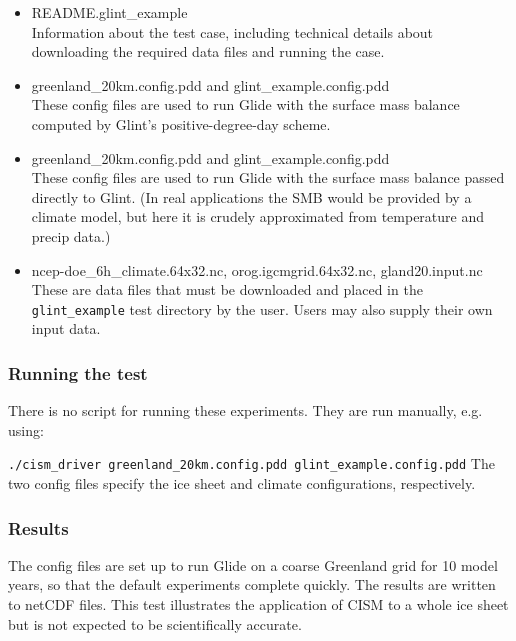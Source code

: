 \begin{itemize}
	\item README.glint\_example \\
         Information about the test case, including technical details about downloading the required data files
         and running the case.
  	\item greenland\_20km.config.pdd and glint\_example.config.pdd \\
  	 These config files are used to run Glide with the surface mass balance computed by Glint's positive-degree-day scheme.
  	\item greenland\_20km.config.pdd and glint\_example.config.pdd \\
  	 These config files are used to run Glide with the surface mass balance passed directly to Glint.
         (In real applications the SMB would be provided by a climate model, but here it is crudely approximated from
         temperature and precip data.)
  	\item  ncep-doe\_6h\_climate.64x32.nc, orog.igcmgrid.64x32.nc, gland20.input.nc \\
    	 These are data files that must be downloaded and placed in the \texttt{glint\_example} test directory by the user.
         Users may also supply their own input data.
\end{itemize}

\subsubsection{Running the test}
There is no script for running these experiments. They are run manually, e.g. using: 

\texttt{./cism\_driver greenland\_20km.config.pdd glint\_example.config.pdd}
%
The two config files specify the ice sheet and climate configurations, respectively. 

\subsubsection{Results}

The config files are set up to run Glide on a coarse Greenland grid for 10 model years,
so that the default experiments complete quickly.  The results are written to netCDF files.
This test illustrates the application of CISM to a whole ice sheet but is not expected
to be scientifically accurate.

